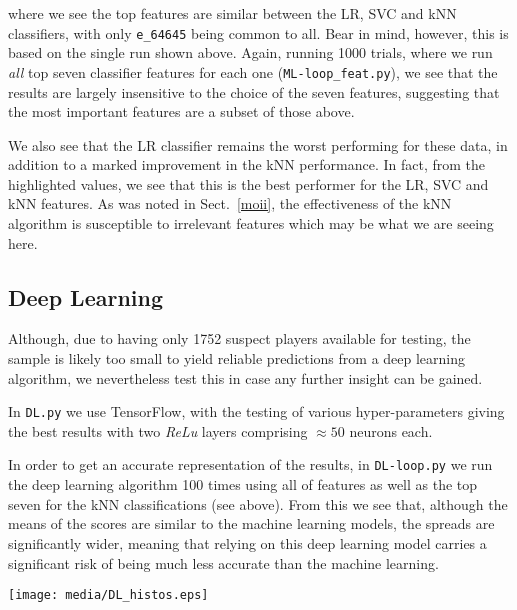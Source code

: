 \documentclass[11pt]{article} %
\begin{document}
\normalsize where we see the top features are similar between the LR, SVC and kNN classifiers, with
only {\tt e\_64645} being common to all.  Bear in mind, however, this is based on the single run
shown above. Again, running 1000 trials, where we run {\em all} top seven classifier features for
each one ({\tt ML-loop\_feat.py}), we see that the results are largely insensitive to the choice of
the seven features, suggesting that the most important features are a subset of those above.

We also see that the LR classifier remains the worst performing for these data, in addition to  a
marked improvement in the kNN performance.  In fact, from the highlighted values, we see that this
is the best performer for the LR, SVC and kNN features.  As was noted in Sect.~\ref{moii}, the
effectiveness of the kNN algorithm is susceptible to irrelevant features which may be what we are seeing
here.

\subsection{Deep Learning}

Although, due to having only 1752 suspect players available for testing, the sample is likely too
small to yield reliable predictions from a deep learning algorithm, we nevertheless test this in
case any further insight can be gained.

In {\tt DL.py} we use {\sf TensorFlow}, with the testing of various hyper-parameters giving the best results with two
{\em ReLu} layers comprising $\approx50$ neurons each. 

\begin{minipage}[l]{0.40\linewidth}

 In order to get an accurate representation of the results, in {\tt DL-loop.py} we run the deep
 learning algorithm 100 times using all of features as well as the top seven for the kNN
 classifications (see above). From this we see that, although the means of the scores are similar to
 the machine learning models, the spreads are significantly wider, meaning that relying on this deep
 learning model carries a significant risk of being much less accurate than the machine learning.
  \end{minipage}\hfill
\begin{minipage}[l]{0.55\linewidth}
 \texttt{[image: media/DL\_histos.eps]}
  
\end{minipage}
\end{document}

